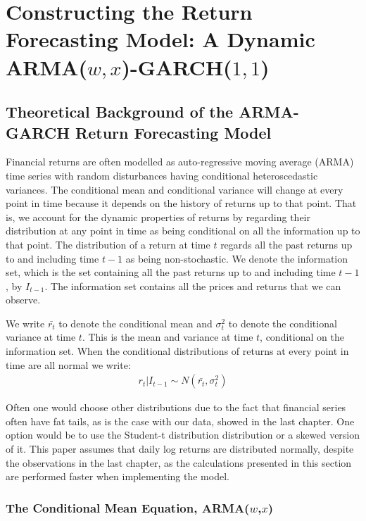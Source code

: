 \section{Constructing the Return Forecasting Model: A Dynamic ARMA($w,x$)-GARCH($1,1$)} 


\subsection{Theoretical Background of the ARMA-GARCH Return Forecasting Model}

Financial returns are often modelled as auto-regressive moving average (ARMA) time series with random disturbances having conditional heteroscedastic variances. The conditional mean and conditional variance will change at every point in time because it depends on the history of returns up to that point. That is, we account for the dynamic properties of returns by regarding their distribution at any point in time as being conditional on all the information up to that point. The distribution of a return at time $t$ regards all the past returns up to and including time $t-1$ as being non-stochastic. We denote the information set, which is the set containing all the past returns up to and including time $t-1$, by $I_{t-1}$. The information set contains all the prices and returns that we can observe.

We write $\bar{r_t}$ to denote the conditional mean and $\sigma_t^2$ to denote the conditional variance at time $t$. This is the mean and variance at time $t$, conditional on the information set. When the conditional distributions of returns at every point in time are all normal we write:
\begin{align}
    r_t | I_{t-1} \sim N(\bar{r_t},{\sigma_t^2})
\end{align}

Often one would choose other distributions due to the fact that financial series often have fat tails, as is the case with our data, showed in the last chapter. One option would be to use the Student-t distribution distribution or a skewed version of it. This paper assumes that daily log returns are distributed normally, despite the observations in the last chapter, as the calculations presented in this section are performed faster when implementing the model.

\subsubsection{The Conditional Mean Equation, ARMA($w$,$x$)}

